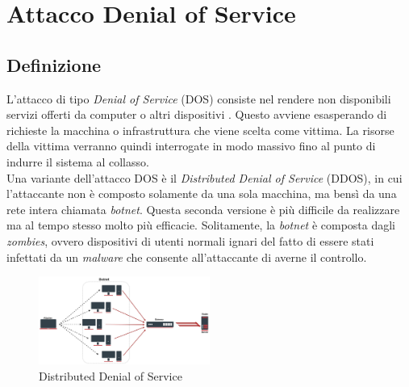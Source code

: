 \section{Attacco Denial of Service}

\subsection{Definizione}
L'attacco di tipo \textit{Denial of Service} (DOS) consiste nel rendere non disponibili servizi offerti da computer o altri
dispositivi \cite{dos-definition}. Questo avviene esasperando di richieste la macchina o infrastruttura che viene scelta come
vittima. La risorse della vittima verranno quindi interrogate in modo massivo fino al punto di indurre il sistema al collasso.\\
Una variante dell'attacco DOS è il \textit{Distributed Denial of Service} (DDOS), in cui l'attaccante non è composto solamente da una sola
macchina, ma bensì da una rete intera chiamata \textit{botnet}. Questa seconda versione è più difficile da realizzare ma al tempo stesso
molto più efficacie. Solitamente, la \textit{botnet} è composta dagli \textit{zombies}, ovvero dispositivi di utenti normali ignari del fatto 
di essere stati infettati da un \textit{malware} che consente all'attaccante di averne il controllo.\\
\begin{figure}[h]
    \centering
    \includegraphics[width=0.5\textwidth]{images/ddos.jpg}
    \caption{Distributed Denial of Service}
\end{figure}

